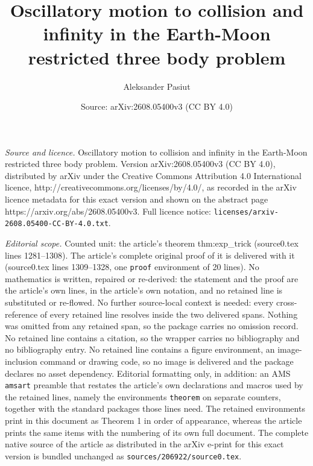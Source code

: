 \documentclass[10pt,a4paper]{amsart}
\title{Oscillatory motion to collision and infinity in the Earth-Moon restricted three body problem}
\author{Aleksander Pasiut}
\date{Source: arXiv:2608.05400v3 (CC BY 4.0)}
\begin{document}
\maketitle

\noindent\emph{Source and licence.} Oscillatory motion to collision and infinity in the Earth-Moon restricted three body problem. Version arXiv:2608.05400v3 (CC BY 4.0), distributed by arXiv under the Creative Commons Attribution 4.0 International licence, http://creativecommons.org/licenses/by/4.0/, as recorded in the arXiv licence metadata for this exact version and shown on the abstract page https://arxiv.org/abs/2608.05400v3. Full licence notice: \texttt{licenses/arxiv-2608.05400-CC-BY-4.0.txt}.\par\smallskip

\noindent\textit{Editorial scope.} Counted unit: the article's theorem thm:exp\_trick (source0.tex lines 1281--1308). The article's complete original proof of it is delivered with it (source0.tex lines 1309--1328, one \texttt{proof} environment of 20 lines). No mathematics is written, repaired or re-derived: the statement and the proof are the article's own lines, in the article's own notation, and no retained line is substituted or re-flowed.  No further source-local context is needed: every cross-reference of every retained line resolves inside the two delivered spans.  Nothing was omitted from any retained span, so the package carries no omission record.  No retained line contains a citation, so the wrapper carries no bibliography and no bibliography entry.  No retained line contains a figure environment, an image-inclusion command or drawing code, so no image is delivered and the package declares no asset dependency.  Editorial formatting only, in addition: an AMS \texttt{amsart} preamble that restates the article's own declarations and macros used by the retained lines, namely the environments \texttt{theorem} on separate counters, together with the standard packages those lines need.  The retained environments print in this document as Theorem 1 in order of appearance, whereas the article prints the same items with the numbering of its own full document.  The complete native source of the article as distributed in the arXiv e-print for this exact version is bundled unchanged as \texttt{sources/206922/source0.tex}.
\end{document}
